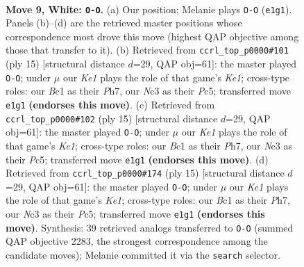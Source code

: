 \documentclass[11pt]{article}
\begin{document}
\clearpage

\begin{figure}[p]\centering
\begin{subfigure}{0.46\textwidth}\centering
\resizebox{\linewidth}{!}{%
\newchessgame
\chessboard[
  setfen={r1bq1rk1/pp2bppp/2n1pn2/2Pp4/3P4/2N2N2/PP2BPPP/R1BQK2R w KQ - 3 9},
  showmover=false,
  pgfstyle=straightmove, color=movearrow, markmove={e1-g1}
]}
\caption{}
\end{subfigure}\hfill
\begin{subfigure}{0.46\textwidth}\centering
\resizebox{\linewidth}{!}{%
\newchessgame
\chessboard[
  setfen={r1bqk2r/pp2bppp/2n2n2/2pp4/3P4/2N2NP1/PP2PPBP/R1BQ1RK1 b kq - 4 8},
  showmover=false,
  pgfstyle=straightmove, color=movearrow, markmove={e8-g8}
]}
\caption{}
\end{subfigure}
\\[4pt]
\begin{subfigure}{0.46\textwidth}\centering
\resizebox{\linewidth}{!}{%
\newchessgame
\chessboard[
  setfen={r1bqk2r/pp2bppp/2n2n2/2pp4/3P4/2N2NP1/PP2PPBP/R1BQ1RK1 b kq - 4 8},
  showmover=false,
  pgfstyle=straightmove, color=movearrow, markmove={e8-g8}
]}
\caption{}
\end{subfigure}\hfill
\begin{subfigure}{0.46\textwidth}\centering
\resizebox{\linewidth}{!}{%
\newchessgame
\chessboard[
  setfen={r1bqk2r/pp2bppp/2n2n2/2pp4/3P4/2N2NP1/PP2PPBP/R1BQ1RK1 b kq - 4 8},
  showmover=false,
  pgfstyle=straightmove, color=movearrow, markmove={e8-g8}
]}
\caption{}
\end{subfigure}
\caption{\textbf{Move 9, White: \texttt{O-O}.} (a) Our position; Melanie plays \texttt{O-O} (\texttt{e1g1}). Panels (b)--(d) are the retrieved master positions whose correspondence most drove this move (highest QAP objective among those that transfer to it). (b) Retrieved from \texttt{ccrl\_top\_p0000\#101} (ply 15) [structural distance $d$=29, QAP obj=61]: the master played \texttt{O-O}; under $\mu$ our \emph{Ke1} plays the role of that game's \emph{Ke1}; cross-type roles: our \emph{B}c1 as their \emph{P}h7, our \emph{N}c3 as their \emph{P}c5; transferred move \texttt{e1g1} \textbf{(endorses this move)}. (c) Retrieved from \texttt{ccrl\_top\_p0000\#102} (ply 15) [structural distance $d$=29, QAP obj=61]: the master played \texttt{O-O}; under $\mu$ our \emph{Ke1} plays the role of that game's \emph{Ke1}; cross-type roles: our \emph{B}c1 as their \emph{P}h7, our \emph{N}c3 as their \emph{P}c5; transferred move \texttt{e1g1} \textbf{(endorses this move)}. (d) Retrieved from \texttt{ccrl\_top\_p0000\#174} (ply 15) [structural distance $d$=29, QAP obj=61]: the master played \texttt{O-O}; under $\mu$ our \emph{Ke1} plays the role of that game's \emph{Ke1}; cross-type roles: our \emph{B}c1 as their \emph{P}h7, our \emph{N}c3 as their \emph{P}c5; transferred move \texttt{e1g1} \textbf{(endorses this move)}. Synthesis: 39 retrieved analogs transferred to \texttt{O-O} (summed QAP objective 2283, the strongest correspondence among the candidate moves); Melanie committed it via the \texttt{search} selector.}
\label{fig:thought-m16}
\end{figure}
\end{document}
